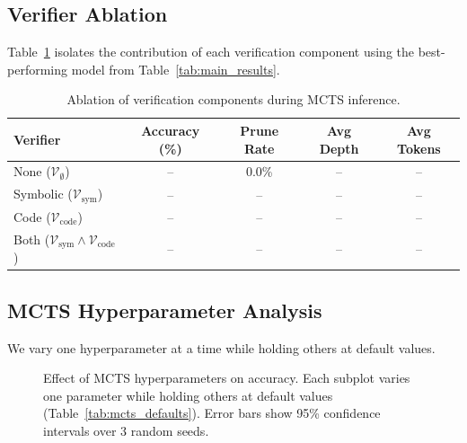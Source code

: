 \documentclass[11pt,a4paper]{article}
\begin{document}

\subsection{Verifier Ablation}

Table~\ref{tab:verifier_ablation} isolates the contribution of each
verification component using the best-performing model from
Table~\ref{tab:main_results}.

\begin{table}[h]
\centering
\caption{Ablation of verification components during MCTS inference.}
\label{tab:verifier_ablation}
\begin{tabular}{lcccc}
\toprule
\textbf{Verifier} & \textbf{Accuracy (\%)} & \textbf{Prune Rate} & \textbf{Avg Depth} & \textbf{Avg Tokens} \\
\midrule
None ($\mathcal{V}_\emptyset$)           & -- & 0.0\% & -- & -- \\
Symbolic ($\mathcal{V}_{\text{sym}}$)    & -- & --    & -- & -- \\
Code ($\mathcal{V}_{\text{code}}$)       & -- & --    & -- & -- \\
Both ($\mathcal{V}_{\text{sym}} \wedge \mathcal{V}_{\text{code}}$) & -- & -- & -- & -- \\
\bottomrule
\end{tabular}
\end{table}


\subsection{MCTS Hyperparameter Analysis}

We vary one hyperparameter at a time while holding others at default values.

\begin{figure}[h]
\centering
\caption{Effect of MCTS hyperparameters on accuracy. Each subplot varies one
parameter while holding others at default values (Table~\ref{tab:mcts_defaults}).
Error bars show 95\% confidence intervals over 3 random seeds.}
\label{fig:hyperparams}
\end{figure}
\end{document}

